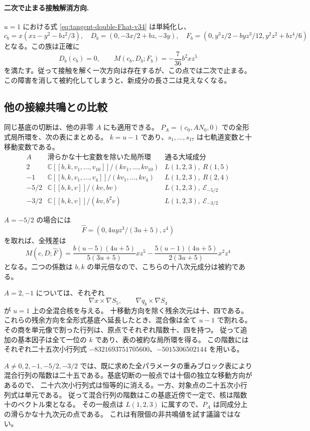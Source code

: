 \paragraph{二次で止まる接触解消方向.}
$u=1$ における式 \eqref{eq:tangent-double-Fhat-v34} は単純化し、
\[
 c_b=x(xz-y^2-bz^2/3),\quad
 D_b=(0,-3x/2+bz,-3y),\quad
 F_b=(0,y^3z/2-byz^3/12,y^2z^2+bz^4/6)
\]
となる。この族は正確に
\[
 D_b(c_b)=0,\qquad M(c_b,D_b;F_b)=-\frac7{36}b^2xz^5
\]
を満たす。従って接触を解く一次方向は存在するが、この点では二次で止まる。
この障害を消して被約化してしまうと、新成分の長さ二は見えなくなる。

\subsection{他の接線共鳴との比較}

同じ基底の切断は、他の非零 $A$ にも適用できる。
$P_A=(c_0,AN_0,0)$ での全形式局所環を、次の表にまとめる。
$k=u-1$ であり、$s_1,\ldots,s_{17}$ は七軌道変数と十移動変数である。
\[
\begin{array}{c|c|c}
 A&\text{滑らかな十七変数を除いた局所環}&\text{通る大域成分}\\\hline
 2&\mathbb C[[b,k,v_1,\ldots,v_{10}]]/(kv_1,\ldots,kv_{10})
   &L(1,2,3),\ R(1,5)\\
 -1&\mathbb C[[b,k,v_1,\ldots,v_4]]/(kv_1,\ldots,kv_4)
   &L(1,2,3),\ R(2,4)\\
 -5/2&\mathbb C[[b,k,v]]/(kv,bv)&L(1,2,3),\ \mathcal E_{-5/2}\\
 -3/2&\mathbb C[[b,k,v]]/(kv,b^2v)&L(1,2,3),\ \mathcal E_{-3/2}
\end{array}
\]

$A=-5/2$ の場合には
\[
 \widehat F=(0,4uyz^3/(3u+5),z^4)
\]
を取れば、全残差は
\[
 M(c,D;\widehat F)
 =\frac{b(u-5)(4u+5)}{5(3u+5)}xz^5
  -\frac{5(u-1)(4u+5)}{2(3u+5)}x^2z^4
\]
となる。二つの係数は $b,k$ の単元倍なので、こちらの十八次元成分は被約である。

$A=2,-1$ については、それぞれ
\[
 \nabla x\times\nabla S_5,\qquad \nabla q_b\times\nabla S_4
\]
が $u=1$ 上の全混合核を与える。
十移動方向を除く残余次元は十、四である。
これらの残余方向を全形式基底へ延長したとき、混合像は全て $u-1$ で割れる。
その商を単元像で割った行列は、原点でそれぞれ階数十、四を持つ。
従って追加の基本因子は全て一位の $k$ であり、表の被約な局所環を得る。
この階数にはそれぞれ二十五次小行列式
$-8321693751705600$、$-5015306502144$ を用いる。

$A\ne0,2,-1,-5/2,-3/2$ では、既に求めた全パラメータの重みブロック表により
混合行列の階数は二十五である。基底切断の一般点では十個の独立な移動方向があるので、
二十六次小行列式は恒等的に消える。一方、対象点の二十五次小行列式は単元である。
従って混合行列の階数はこの基底近傍で一定で、核は階数十のベクトル束となる。
その一般点は $L(1,2,3)$ に属すので、$P_A$ は同成分上の滑らかな十九次元の点である。
これは有限個の非共鳴値を試す議論ではない。

